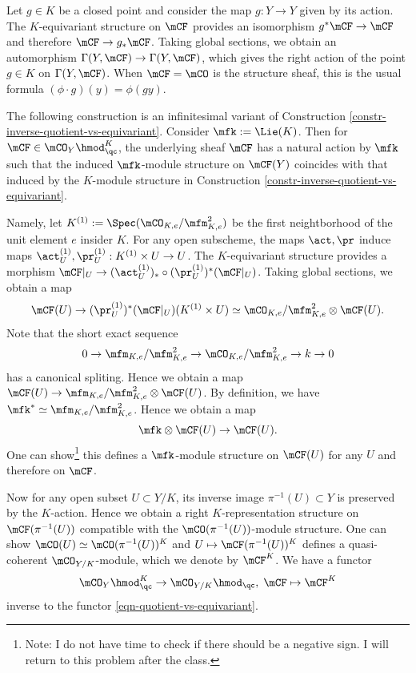 	\begin{rem}
		Let $g\in K$ be a closed point and consider the map $g: Y \to Y$ given by its action. The $K$-equivariant structure on $\mCF$ provides an isomorphism $g^*\mCF \to \mCF$ and therefore $\mCF \to g_*\mCF$. Taking global sections, we obtain an automorphism $\Gamma(Y,\mCF) \to \Gamma(Y,\mCF) $, which gives the right action of the point $g\in K$ on $\Gamma(Y,\mCF)$. When $\mCF=\mCO$ is the structure sheaf, this is the usual formula $(\phi\cdot g)(y) = \phi(gy)$.
	\end{rem}	

	\begin{constr}
		\label{constr-infinitesimal-action-on-equivariant}
		The following construction is an infinitesimal variant of Construction \ref{constr-inverse-quotient-vs-equivariant}. Consider $\mfk:=\Lie(K)$. Then for $\mCF\in \mCO_Y \hmod_\qc^K$, the underlying sheaf $\mCF$ has a natural action by $\mfk$ such that the induced $\mfk$-module structure on $\mCF(Y)$ coincides with that induced by the $K$-module structure in Construction \ref{constr-inverse-quotient-vs-equivariant}.

		Namely, let $K^{(1)}:= \Spec( \mCO_{K,e}/\mfm_{K,e}^2 )$ be the first neightborhood of the unit element $e$ insider $K$. For any open subscheme, the maps $\act,\pr$ induce maps $\act_U^{(1)} ,\pr_U^{(1)}: K^{(1)} \mt U \to U$. The $K$-equivariant structure provides a morphism $\mCF|_U \to (\act_U^{(1)})_* \circ (\pr_U^{(1)})^* (\mCF|_U)$. Taking global sections, we obtain a map
		\[
			\mCF(U) \to (\pr_U^{(1)})^* (\mCF|_U)( K^{(1)} \mt U) \simeq \mCO_{K,e}/\mfm_{K,e}^2 \ot \mCF(U).
		\]
		Note that the short exact sequence
		\[
			0 \to \mfm_{K,e}/\mfm_{K,e}^2 \to \mCO_{K,e}/\mfm_{K,e}^2 \to k \to 0
		\]
		has a canonical spliting. Hence we obtain a map $\mCF(U) \to \mfm_{K,e}/\mfm_{K,e}^2\ot \mCF(U)$. By definition, we have $\mfk^* \simeq \mfm_{K,e}/\mfm_{K,e}^2$. Hence we obtain a map
		\[
			\mfk\ot \mCF(U) \to \mCF(U).
		\]
		One can show\footnote{Note: I do not have time to check if there should be a negative sign. I will return to this problem after the class.} this defines a $\mfk$-module structure on $\mCF(U)$ for any $U$ and therefore on $\mCF$. 
		
	\end{constr}


	\begin{constr}
		Now for any open subset $U\subset Y/K$, its inverse image $\pi^{-1}(U)\subset Y$ is preserved by the $K$-action. Hence we obtain a right $K$-representation structure on $\mCF(\pi^{-1}(U))$ compatible with the $\mCO(\pi^{-1}(U))$-module structure. One can show $\mCO(U) \simeq \mCO(\pi^{-1}(U))^K$ and $U \mapsto \mCF(\pi^{-1}(U))^K$ defines a quasi-coherent $\mCO_{Y/K}$-module, which we denote by $\mCF^K$. We have a functor
		\[
			 \mCO_Y \hmod_\qc^K\to \mCO_{Y/K}\hmod_\qc ,\; \mCF \mapsto \mCF^K
		\]
		inverse to the functor \eqref{eqn-quotient-vs-equivariant}.
	\end{constr}

